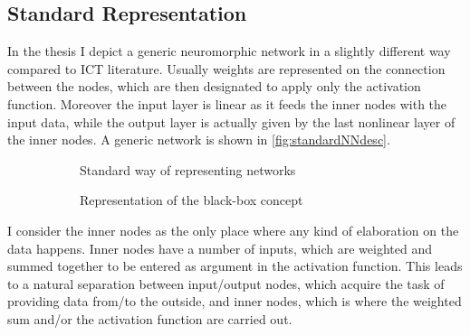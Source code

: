 
\newpage
\subsection{Standard Representation}
\label{sec:standard_representation}
In the thesis I depict a generic neuromorphic network in a slightly different way compared to ICT literature.
Usually weights are represented on the connection between the nodes, which are then designated to apply only the activation function.
Moreover the input layer is linear as it feeds the inner nodes with the input data, while the output layer is actually given by the last nonlinear layer of the inner nodes.
A generic network is shown in \autoref{fig:standardNNdesc}.

\begin{figure}[ht]
	\begin{subfigure}[b]{0.49\textwidth}
		\centering
		
		\caption{Standard way of representing networks}
		\label{fig:standardNNdesc}
  \end{subfigure}
  \begin{subfigure}[b]{0.49\textwidth}
  		\centering
		
		\caption{Representation of the black-box concept}
		\label{fig:black_box_NN}
  \end{subfigure}
  \caption{}
  	\label{fig:description_comparison}
\end{figure}

I consider the inner nodes as the only place where any kind of elaboration on the data happens.
Inner nodes have a number of inputs, which are weighted and summed together to be entered as argument in the activation function.
This leads to a natural separation between input/output nodes, which acquire the task of providing data from/to the outside, and inner nodes, which is where the weighted sum and/or the activation function are carried out.

